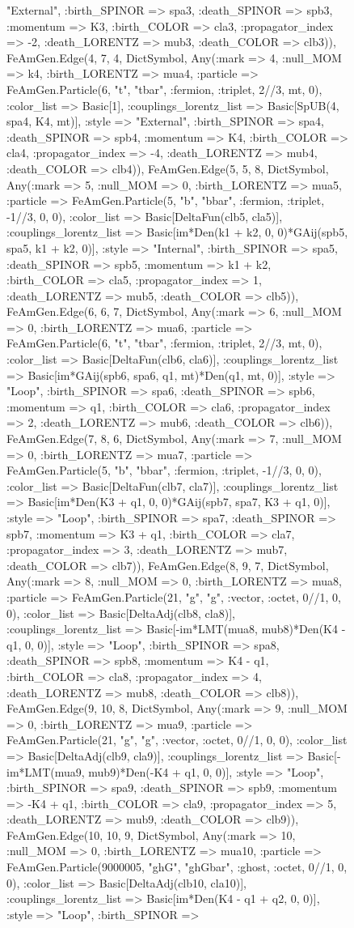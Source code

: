 \documentclass{revtex4}
\begin{document}
\begin{figure}[!htb]
\begin{center}
{"External", :birth_SPINOR => spa3, :death_SPINOR => spb3, :momentum => K3, :birth_COLOR => cla3, :propagator_index => -2, :death_LORENTZ => mub3, :death_COLOR => clb3)), FeAmGen.Edge(4, 7, 4, Dict{Symbol, Any}(:mark => 4, :null_MOM => k4, :birth_LORENTZ => mua4, :particle => FeAmGen.Particle(6, "t", "tbar", :fermion, :triplet, 2//3, mt, 0), :color_list => Basic[1], :couplings_lorentz_list => Basic[SpUB(4, spa4, K4, mt)], :style => "External", :birth_SPINOR => spa4, :death_SPINOR => spb4, :momentum => K4, :birth_COLOR => cla4, :propagator_index => -4, :death_LORENTZ => mub4, :death_COLOR => clb4)), FeAmGen.Edge(5, 5, 8, Dict{Symbol, Any}(:mark => 5, :null_MOM => 0, :birth_LORENTZ => mua5, :particle => FeAmGen.Particle(5, "b", "bbar", :fermion, :triplet, -1//3, 0, 0), :color_list => Basic[DeltaFun(clb5, cla5)], :couplings_lorentz_list => Basic[im*Den(k1 + k2, 0, 0)*GAij(spb5, spa5, k1 + k2, 0)], :style => "Internal", :birth_SPINOR => spa5, :death_SPINOR => spb5, :momentum => k1 + k2, :birth_COLOR => cla5, :propagator_index => 1, :death_LORENTZ => mub5, :death_COLOR => clb5)), FeAmGen.Edge(6, 6, 7, Dict{Symbol, Any}(:mark => 6, :null_MOM => 0, :birth_LORENTZ => mua6, :particle => FeAmGen.Particle(6, "t", "tbar", :fermion, :triplet, 2//3, mt, 0), :color_list => Basic[DeltaFun(clb6, cla6)], :couplings_lorentz_list => Basic[im*GAij(spb6, spa6, q1, mt)*Den(q1, mt, 0)], :style => "Loop", :birth_SPINOR => spa6, :death_SPINOR => spb6, :momentum => q1, :birth_COLOR => cla6, :propagator_index => 2, :death_LORENTZ => mub6, :death_COLOR => clb6)), FeAmGen.Edge(7, 8, 6, Dict{Symbol, Any}(:mark => 7, :null_MOM => 0, :birth_LORENTZ => mua7, :particle => FeAmGen.Particle(5, "b", "bbar", :fermion, :triplet, -1//3, 0, 0), :color_list => Basic[DeltaFun(clb7, cla7)], :couplings_lorentz_list => Basic[im*Den(K3 + q1, 0, 0)*GAij(spb7, spa7, K3 + q1, 0)], :style => "Loop", :birth_SPINOR => spa7, :death_SPINOR => spb7, :momentum => K3 + q1, :birth_COLOR => cla7, :propagator_index => 3, :death_LORENTZ => mub7, :death_COLOR => clb7)), FeAmGen.Edge(8, 9, 7, Dict{Symbol, Any}(:mark => 8, :null_MOM => 0, :birth_LORENTZ => mua8, :particle => FeAmGen.Particle(21, "g", "g", :vector, :octet, 0//1, 0, 0), :color_list => Basic[DeltaAdj(clb8, cla8)], :couplings_lorentz_list => Basic[-im*LMT(mua8, mub8)*Den(K4 - q1, 0, 0)], :style => "Loop", :birth_SPINOR => spa8, :death_SPINOR => spb8, :momentum => K4 - q1, :birth_COLOR => cla8, :propagator_index => 4, :death_LORENTZ => mub8, :death_COLOR => clb8)), FeAmGen.Edge(9, 10, 8, Dict{Symbol, Any}(:mark => 9, :null_MOM => 0, :birth_LORENTZ => mua9, :particle => FeAmGen.Particle(21, "g", "g", :vector, :octet, 0//1, 0, 0), :color_list => Basic[DeltaAdj(clb9, cla9)], :couplings_lorentz_list => Basic[-im*LMT(mua9, mub9)*Den(-K4 + q1, 0, 0)], :style => "Loop", :birth_SPINOR => spa9, :death_SPINOR => spb9, :momentum => -K4 + q1, :birth_COLOR => cla9, :propagator_index => 5, :death_LORENTZ => mub9, :death_COLOR => clb9)), FeAmGen.Edge(10, 10, 9, Dict{Symbol, Any}(:mark => 10, :null_MOM => 0, :birth_LORENTZ => mua10, :particle => FeAmGen.Particle(9000005, "ghG", "ghGbar", :ghost, :octet, 0//1, 0, 0), :color_list => Basic[DeltaAdj(clb10, cla10)], :couplings_lorentz_list => Basic[im*Den(K4 - q1 + q2, 0, 0)], :style => "Loop", :birth_SPINOR => }
\end{center}
\end{figure}
\end{document}
